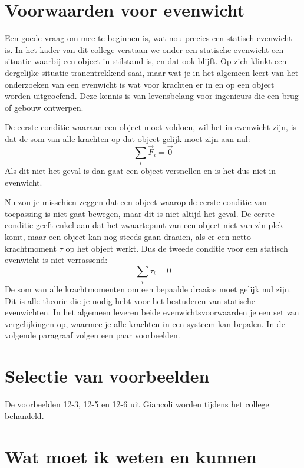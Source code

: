 \section{Voorwaarden voor evenwicht}

Een goede vraag om mee te beginnen is, wat nou precies een statisch evenwicht is. In het 
kader van dit college verstaan we onder een  statische evenwicht een situatie waarbij een 
object in stilstand is, en dat ook blijft. Op zich klinkt een dergelijke situatie tranentrekkend saai, 
maar wat je in het algemeen leert van het onderzoeken van een evenwicht is wat voor krachten
er in en op een object worden uitgeoefend. Deze kennis is van levensbelang voor ingenieurs
die een brug of gebouw ontwerpen.

De eerste conditie waaraan een object moet voldoen, wil het in evenwicht zijn, is dat de som 
van alle krachten op dat object gelijk moet zijn aan nul:
\begin{equation}
\sum_i \vec{F}_i = \vec{0}
\end{equation}
Als dit niet het geval is dan gaat een object versnellen en is het dus niet in evenwicht.

Nu zou je misschien zeggen dat een object waarop de eerste conditie van toepassing is niet
gaat bewegen, maar dit is niet altijd het geval. De eerste conditie geeft enkel aan dat het 
zwaartepunt van een object niet van z'n plek komt, maar een object kan nog steeds gaan
draaien, als er een netto krachtmoment $\tau$ op het object werkt. Dus de tweede conditie
voor een statisch evenwicht is niet verrassend:
\begin{equation}
\sum_i \tau_i = 0
\end{equation}
De som van alle krachtmomenten om een bepaalde draaias moet gelijk nul zijn. Dit is alle
theorie die je nodig hebt voor het bestuderen van statische evenwichten. In het algemeen 
leveren beide evenwichtsvoorwaarden je een set van vergelijkingen op, waarmee je alle
krachten in een systeem kan bepalen. In de volgende paragraaf volgen een paar voorbeelden.

\section{Selectie van voorbeelden}

De voorbeelden 12-3, 12-5 en 12-6 uit Giancoli worden tijdens het college behandeld. 

\section{Wat moet ik weten en kunnen}

